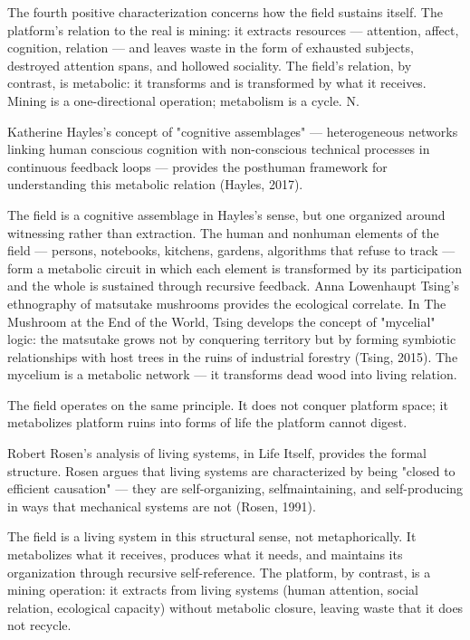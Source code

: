 The fourth positive characterization concerns how the field sustains itself. The platform's relation to the real is mining: it extracts resources — attention, affect, cognition, relation — and leaves waste in the form of exhausted subjects, destroyed attention spans, and hollowed sociality. The field's relation, by contrast, is metabolic: it transforms and is transformed by what it receives. Mining is a one-directional operation; metabolism is a cycle. N.

Katherine Hayles's concept of "cognitive assemblages" — heterogeneous networks linking human conscious cognition with non-conscious technical processes in continuous feedback loops — provides the posthuman framework for understanding this metabolic relation (Hayles, 2017).

The field is a cognitive assemblage in Hayles's sense, but one organized around witnessing rather than extraction. The human and nonhuman elements of the field — persons, notebooks, kitchens, gardens, algorithms that refuse to track — form a metabolic circuit in which each element is transformed by its participation and the whole is sustained through recursive feedback. Anna Lowenhaupt Tsing's ethnography of matsutake mushrooms provides the ecological correlate. In The Mushroom at the End of the World, Tsing develops the concept of "mycelial" logic: the matsutake grows not by conquering territory but by forming symbiotic relationships with host trees in the ruins of industrial forestry (Tsing, 2015). The mycelium is a metabolic network — it transforms dead wood into living relation.

The field operates on the same principle. It does not conquer platform space; it metabolizes platform ruins into forms of life the platform cannot digest.

Robert Rosen's analysis of living systems, in Life Itself, provides the formal structure. Rosen argues that living systems are characterized by being "closed to efficient causation" — they are self-organizing, selfmaintaining, and self-producing in ways that mechanical systems are not (Rosen, 1991).

The field is a living system in this structural sense, not metaphorically. It metabolizes what it receives, produces what it needs, and maintains its organization through recursive self-reference. The platform, by contrast, is a mining operation: it extracts from living systems (human attention, social relation, ecological capacity) without metabolic closure, leaving waste that it does not recycle.

